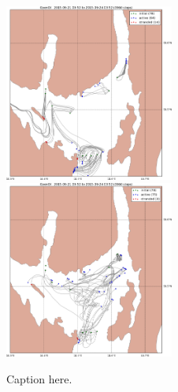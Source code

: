 \documentclass[12pt,a4paper,english]{article}
\begin{document}
\begin{figure}[ht]
\centerline{
\includegraphics*[width=0.495\textwidth]{Opendrift_simulations/LTR3/tokt_drifters_winddrift_0p0_radius_0_num_6_plusminus_2p5h_crop}
\includegraphics*[width=0.495\textwidth]{Opendrift_simulations/LTR3/tokt_drifters_winddrift_0p0_radius_0_num_6_plusminus_2p5h_norkyst_crop}
}
\caption{\small
Caption here.
}
\label{fig:opendriftD2}
\end{figure}
\end{document}
